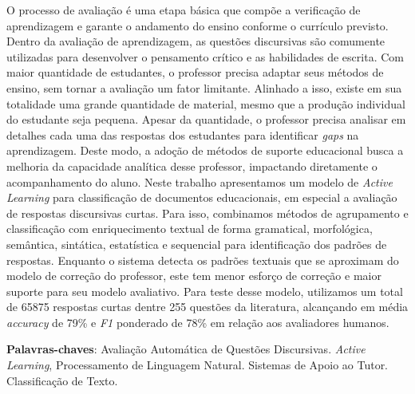 O processo de avaliação é uma etapa básica que compõe a verificação de aprendizagem e garante o andamento do ensino conforme o currículo previsto. Dentro da avaliação de aprendizagem, as questões discursivas são comumente utilizadas para desenvolver o pensamento crítico e as habilidades de escrita. Com maior quantidade de estudantes, o professor precisa adaptar seus métodos de ensino, sem tornar a avaliação um fator limitante. Alinhado a isso, existe em sua totalidade uma grande quantidade de material, mesmo que a produção individual do estudante seja pequena. Apesar da quantidade, o professor precisa analisar em detalhes cada uma das respostas dos estudantes para identificar \textit{gaps} na aprendizagem. Deste modo, a adoção de métodos de suporte educacional busca a melhoria da capacidade analítica desse professor, impactando diretamente o acompanhamento do aluno. Neste trabalho apresentamos um modelo de \textit{Active Learning} para classificação de documentos educacionais, em especial a avaliação de respostas discursivas curtas. Para isso, combinamos métodos de agrupamento e classificação com enriquecimento textual de forma gramatical, morfológica, semântica, sintática, estatística e sequencial para identificação dos padrões de respostas. Enquanto o sistema detecta os padrões textuais que se aproximam do modelo de correção do professor, este tem menor esforço de correção e maior suporte para seu modelo avaliativo. Para teste desse modelo, utilizamos um total de 65875 respostas curtas dentre 255 questões da literatura, alcançando em média \textit{accuracy} de 79\% e \textit{F1} ponderado de 78\% em relação aos avaliadores humanos.


\textbf{Palavras-chaves}: Avaliação Automática de Questões Discursivas. \textit{Active Learning}, Processamento de Linguagem Natural. Sistemas de Apoio ao Tutor. Classificação de Texto.
